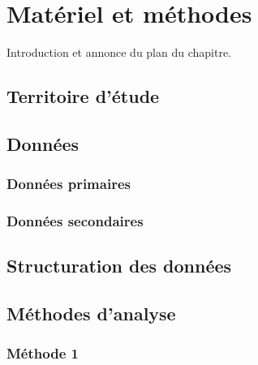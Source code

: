 \chapter{Matériel et méthodes} \label{chap:metho}

Introduction et annonce du plan du chapitre.

\lipsum[1] %


\section{Territoire d’étude} \label{sec:territoire_etude}

\lipsum[1-2] %


\section{Données} \label{sec:donnees}

\subsection{Données primaires} \label{subsec:donnees_primaires}

\lipsum[1] %


\subsection{Données secondaires} \label{subsec:donnees_secondaires}

\lipsum[1] %


\section{Structuration des données} \label{sec:structuration_donnees}

\lipsum[1] %


\section{Méthodes d’analyse} \label{sec:methodes_analyses}

\subsection{Méthode 1} \label{subsec:methodes1}

